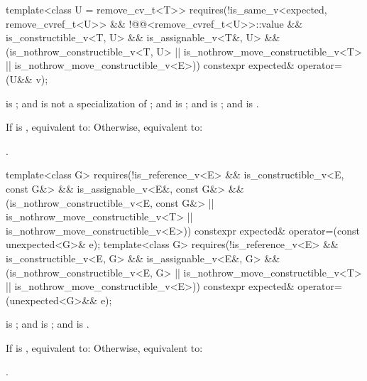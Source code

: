 %
\begin{itemdecl}
template<class U = remove_cv_t<T>>
  requires(!is_same_v<expected, remove_cvref_t<U>> &&
           !@@<remove_cvref_t<U>>::value &&
           is_constructible_v<T, U> && is_assignable_v<T&, U> &&
           (is_nothrow_constructible_v<T, U> || is_nothrow_move_constructible_v<T> ||
            is_nothrow_move_constructible_v<E>))
constexpr expected& operator=(U&& v);
\end{itemdecl}

\begin{itemdescr}
\pnum
\constraints
{} is ; and  is not a specialization of ; and  is ; and  is ; and  is .

\pnum
\effects
If  is , equivalent to:  Otherwise, equivalent to: 

\pnum
\returns
{}.
\end{itemdescr}

%
\begin{itemdecl}
template<class G>
  requires(!is_reference_v<E> && is_constructible_v<E, const G&> &&
           is_assignable_v<E&, const G&> &&
           (is_nothrow_constructible_v<E, const G&> ||
            is_nothrow_move_constructible_v<T> || is_nothrow_move_constructible_v<E>))
constexpr expected& operator=(const unexpected<G>& e);
template<class G>
  requires(!is_reference_v<E> && is_constructible_v<E, G> && is_assignable_v<E&, G> &&
           (is_nothrow_constructible_v<E, G> || is_nothrow_move_constructible_v<T> ||
            is_nothrow_move_constructible_v<E>))
constexpr expected& operator=(unexpected<G>&& e);
\end{itemdecl}

\begin{itemdescr}
\pnum
\constraints
{} is ; and  is ; and  is .

\pnum
\effects
If  is , equivalent to:  Otherwise, equivalent to: 

\pnum
\returns
{}.
\end{itemdescr}

